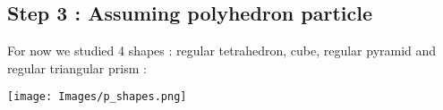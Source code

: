 \subsection{Step 3 : Assuming polyhedron particle}

For now we studied 4 shapes : regular tetrahedron, cube, regular pyramid and regular triangular prism :

\texttt{[image: Images/p\_shapes.png]}